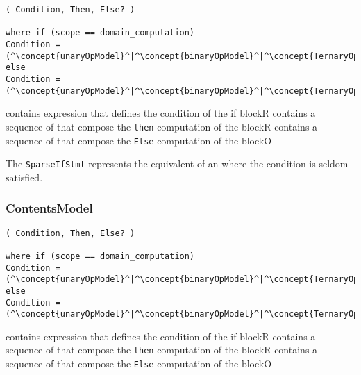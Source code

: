 \begin{lstlisting}[style=default,frame=none]
( Condition, Then, Else? )

where if (scope == domain_computation)
Condition = (^\concept{unaryOpModel}^|^\concept{binaryOpModel}^|^\concept{TernaryOp}^|^\concept{FieldAccess}^|^\concept{VarAccess}^|^\concept{Literal}^|^\irrconcept{NeighbourReduce}^)
else
Condition = (^\concept{unaryOpModel}^|^\concept{binaryOpModel}^|^\concept{TernaryOp}^|^\concept{VarAccess}^|^\concept{Literal}^)
\end{lstlisting}

\begin{HIRChildElements}
	{contains expression that defines the condition of the if block}{R}
	{contains a sequence of  that compose the {\tt then} 
	 computation of the block}{R}
	{contains a sequence of  that compose the {\tt Else} 
	 computation of the block}{O}
\end{HIRChildElements}

The {\tt SparseIfStmt} represents the equivalent of an  where the condition is seldom satisfied.

\subsubsection*{ContentsModel}{}

\begin{lstlisting}[style=default,frame=none]
( Condition, Then, Else? )

where if (scope == domain_computation)
Condition = (^\concept{unaryOpModel}^|^\concept{binaryOpModel}^|^\concept{TernaryOp}^|^\concept{FieldAccess}^|^\concept{VarAccess}^|^\concept{Literal}^|^\irrconcept{NeighbourReduce}^)
else
Condition = (^\concept{unaryOpModel}^|^\concept{binaryOpModel}^|^\concept{TernaryOp}^|^\concept{VarAccess}^|^\concept{Literal}^)
\end{lstlisting}

\begin{HIRChildElements}
	{contains expression that defines the condition of the if block}{R}
	{contains a sequence of  that compose the {\tt then} 
		computation of the block}{R}
	{contains a sequence of  that compose the {\tt Else} 
		computation of the block}{O}
\end{HIRChildElements}

